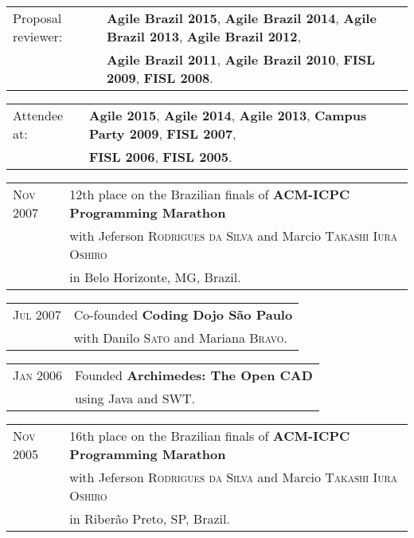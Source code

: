 \documentclass[letter,10pt]{article}
\begin{document}
\begin{tabular}{p{3cm}l}
  Proposal reviewer: & \textbf{Agile Brazil 2015}, \textbf{Agile Brazil 2014}, \textbf{Agile Brazil 2013}, \textbf{Agile Brazil 2012},\\
  & \textbf{Agile Brazil 2011}, \textbf{Agile Brazil 2010}, \textbf{FISL 2009}, \textbf{FISL 2008}.
\end{tabular}

\begin{tabular}{p{3cm}l}
  Attendee at: & \textbf{Agile 2015}, \textbf{Agile 2014}, \textbf{Agile 2013}, \textbf{Campus Party 2009}, \textbf{FISL 2007},\\
  & \textbf{FISL 2006}, \textbf{FISL 2005}.
\end{tabular}

\begin{tabular}{p{3cm}l}
  \textsc{Nov 2007} & 12th place on the Brazilian finals of \textbf{ACM-ICPC
    Programming Marathon}\\
  & with Jeferson \textsc{Rodrigues da Silva} and Marcio
  \textsc{Takashi Iura Oshiro}\\
  & in Belo Horizonte, MG, Brazil.\\
\end{tabular}

\begin{tabular}{p{3cm}l}
  \textsc{Jul 2007} & Co-founded \textbf{Coding Dojo São Paulo}\\
  & with Danilo \textsc{Sato} and Mariana \textsc{Bravo}.\\
\end{tabular}

\begin{tabular}{p{3cm}l}
  \textsc{Jan 2006} & Founded \textbf{Archimedes: The Open CAD}\\
  & using Java and SWT.\\
\end{tabular}

\begin{tabular}{p{3cm}l}
  \textsc{Nov 2005} & 16th place on the Brazilian finals of \textbf{ACM-ICPC
    Programming Marathon}\\
  & with Jeferson \textsc{Rodrigues da Silva} and Marcio
  \textsc{Takashi Iura Oshiro}\\
  & in Riberão Preto, SP, Brazil.\\
\end{tabular}
\end{document}
